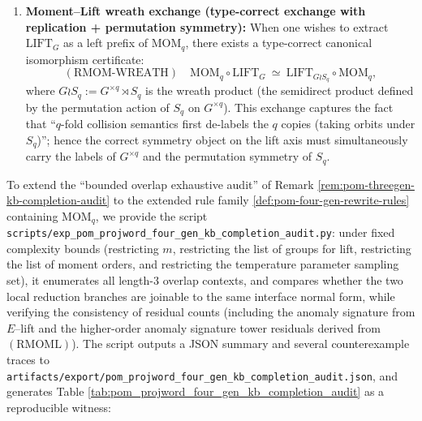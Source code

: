 \begin{definition}
\begin{enumerate}
  The auditable output of this distribution law is organized by the higher-order anomaly signature tower \(\mathsf{Anom}^{(q)}_G(K;\theta)\) (Definition \ref{def:pom-anom-signature-tower}).
  \item \textbf{Moment--Lift wreath exchange (type-correct exchange with replication + permutation symmetry):}
  When one wishes to extract \(\mathrm{LIFT}_G\) as a left prefix of \(\mathrm{MOM}_q\), there exists a type-correct canonical isomorphism certificate:
  \[
  (\mathrm{RMOM\text{-}WREATH})\quad
  \mathrm{MOM}_q\circ \mathrm{LIFT}_G
  \ \simeq\
  \mathrm{LIFT}_{G\wr S_q}\circ \mathrm{MOM}_q,
  \]
  where
  \(G\wr S_q:=G^{\times q}\rtimes S_q\)
  is the wreath product (the semidirect product defined by the permutation action of \(S_q\) on \(G^{\times q}\)).
  This exchange captures the fact that ``\(q\)-fold collision semantics first de-labels the \(q\) copies (taking orbits under \(S_q\))''; hence the correct symmetry object on the lift axis must simultaneously carry the labels of \(G^{\times q}\) and the permutation symmetry of \(S_q\).
\end{enumerate}
\end{definition}

\begin{remark}\label{rem:pom-fourgen-kb-completion-audit}
To extend the ``bounded overlap exhaustive audit'' of Remark \ref{rem:pom-threegen-kb-completion-audit} to the extended rule family \ref{def:pom-four-gen-rewrite-rules} containing \(\mathrm{MOM}_q\),
we provide the script
\texttt{scripts/exp\_pom\_projword\_four\_gen\_kb\_completion\_audit.py}:
under fixed complexity bounds (restricting \(m\), restricting the list of groups for lift, restricting the list of moment orders, and restricting the temperature parameter sampling set), it enumerates all length-\(3\) overlap contexts,
and compares whether the two local reduction branches are joinable to the same interface normal form, while verifying the consistency of residual counts (including the anomaly signature from \(E\)--lift and the higher-order anomaly signature tower residuals derived from \((\mathrm{RMOML})\)).
The script outputs a JSON summary and several counterexample traces to
\texttt{artifacts/export/pom\_projword\_four\_gen\_kb\_completion\_audit.json},
and generates Table \ref{tab:pom_projword_four_gen_kb_completion_audit} as a reproducible witness:

\end{remark}

